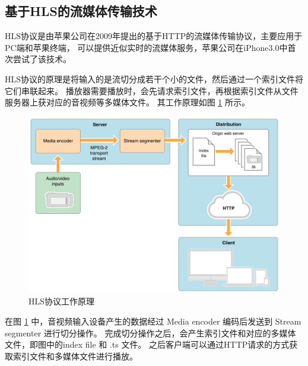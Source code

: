 
\subsection{基于HLS的流媒体传输技术}
HLS协议是由苹果公司在2009年提出的基于HTTP的流媒体传输协议，主要应用于PC端和苹果终端，
可以提供近似实时的流媒体服务，苹果公司在iPhone3.0中首次尝试了该技术\cite{魏雪飞2020HLS}。

HLS协议的原理是将输入的是流切分成若干个小的文件，然后通过一个索引文件将它们串联起来。
播放器需要播放时，会先请求索引文件，再根据索引文件从文件服务器上获对应的音视频等多媒体文件。
其工作原理如图 \ref{Fig:hls} 所示。

\begin{figure}[ht]
    \centering
    \includegraphics[width=1\linewidth]{./Figure/IMG_hls.png}
    \caption{HLS协议工作原理}
    \label{Fig:hls}
\end{figure}

在图  \ref{Fig:hls} 中，音视频输入设备产生的数据经过 Media encoder 编码后发送到 Stream segmenter 
进行切分操作。
完成切分操作之后，会产生索引文件和对应的多媒体文件，即图中的index file 和 .ts 文件。
之后客户端可以通过HTTP请求的方式获取索引文件和多媒体文件进行播放。




